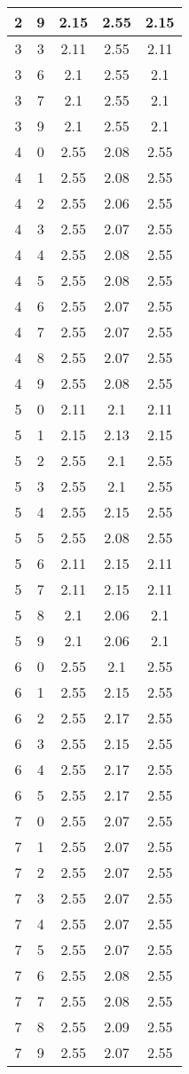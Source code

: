 \begin{longtable}{|c|c||c||c||c|}
	2 & 9 & 2.15 & 2.55 & 2.15 \\ \hline
	3 & 3 & 2.11 & 2.55 & 2.11 \\ \hline
	3 & 6 & 2.1 & 2.55 & 2.1 \\ \hline
	3 & 7 & 2.1 & 2.55 & 2.1 \\ \hline
	3 & 9 & 2.1 & 2.55 & 2.1 \\ \hline
	4 & 0 & 2.55 & 2.08 & 2.55 \\ \hline
	4 & 1 & 2.55 & 2.08 & 2.55 \\ \hline
	4 & 2 & 2.55 & 2.06 & 2.55 \\ \hline
	4 & 3 & 2.55 & 2.07 & 2.55 \\ \hline
	4 & 4 & 2.55 & 2.08 & 2.55 \\ \hline
	4 & 5 & 2.55 & 2.08 & 2.55 \\ \hline
	4 & 6 & 2.55 & 2.07 & 2.55 \\ \hline
	4 & 7 & 2.55 & 2.07 & 2.55 \\ \hline
	4 & 8 & 2.55 & 2.07 & 2.55 \\ \hline
	4 & 9 & 2.55 & 2.08 & 2.55 \\ \hline
	5 & 0 & 2.11 & 2.1 & 2.11 \\ \hline
	5 & 1 & 2.15 & 2.13 & 2.15 \\ \hline
	5 & 2 & 2.55 & 2.1 & 2.55 \\ \hline
	5 & 3 & 2.55 & 2.1 & 2.55 \\ \hline
	5 & 4 & 2.55 & 2.15 & 2.55 \\ \hline
	5 & 5 & 2.55 & 2.08 & 2.55 \\ \hline
	5 & 6 & 2.11 & 2.15 & 2.11 \\ \hline
	5 & 7 & 2.11 & 2.15 & 2.11 \\ \hline
	5 & 8 & 2.1 & 2.06 & 2.1 \\ \hline
	5 & 9 & 2.1 & 2.06 & 2.1 \\ \hline
	6 & 0 & 2.55 & 2.1 & 2.55 \\ \hline
	6 & 1 & 2.55 & 2.15 & 2.55 \\ \hline
	6 & 2 & 2.55 & 2.17 & 2.55 \\ \hline
	6 & 3 & 2.55 & 2.15 & 2.55 \\ \hline
	6 & 4 & 2.55 & 2.17 & 2.55 \\ \hline
	6 & 5 & 2.55 & 2.17 & 2.55 \\ \hline
	7 & 0 & 2.55 & 2.07 & 2.55 \\ \hline
	7 & 1 & 2.55 & 2.07 & 2.55 \\ \hline
	7 & 2 & 2.55 & 2.07 & 2.55 \\ \hline
	7 & 3 & 2.55 & 2.07 & 2.55 \\ \hline
	7 & 4 & 2.55 & 2.07 & 2.55 \\ \hline
	7 & 5 & 2.55 & 2.07 & 2.55 \\ \hline
	7 & 6 & 2.55 & 2.08 & 2.55 \\ \hline
	7 & 7 & 2.55 & 2.08 & 2.55 \\ \hline
	7 & 8 & 2.55 & 2.09 & 2.55 \\ \hline
	7 & 9 & 2.55 & 2.07 & 2.55 \\ \hline
\end{longtable}
